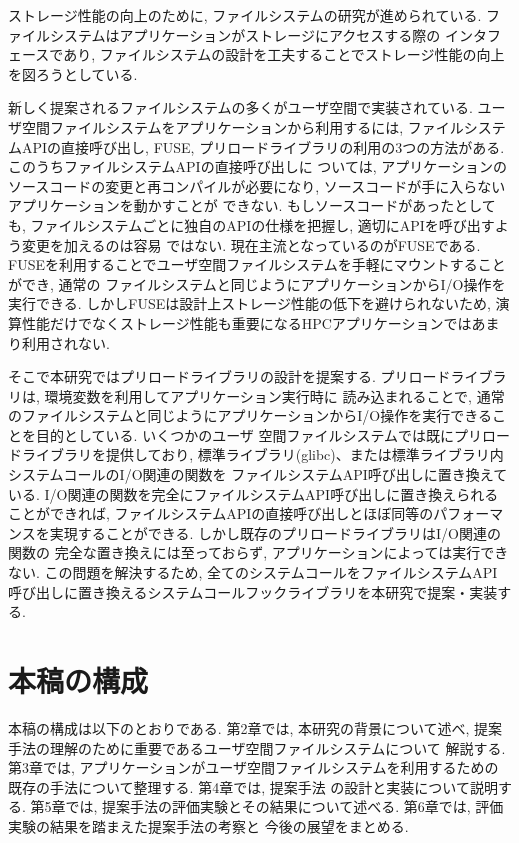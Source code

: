 \documentclass[a4paper,11pt]{jreport}
\begin{document}
ストレージ性能の向上のために, ファイルシステムの研究が進められている. ファイルシステムはアプリケーションがストレージにアクセスする際の
インタフェースであり, ファイルシステムの設計を工夫することでストレージ性能の向上を図ろうとしている.  

新しく提案されるファイルシステムの多くがユーザ空間で実装されている. ユーザ空間ファイルシステムをアプリケーションから利用するには, 
ファイルシステムAPIの直接呼び出し, FUSE, プリロードライブラリの利用の3つの方法がある. このうちファイルシステムAPIの直接呼び出しに
ついては, アプリケーションのソースコードの変更と再コンパイルが必要になり, ソースコードが手に入らないアプリケーションを動かすことが
できない. もしソースコードがあったとしても, ファイルシステムごとに独自のAPIの仕様を把握し, 適切にAPIを呼び出すよう変更を加えるのは容易
ではない. 現在主流となっているのがFUSEである. FUSEを利用することでユーザ空間ファイルシステムを手軽にマウントすることができ, 通常の
ファイルシステムと同じようにアプリケーションからI/O操作を実行できる. しかしFUSEは設計上ストレージ性能の低下を避けられないため, 
演算性能だけでなくストレージ性能も重要になるHPCアプリケーションではあまり利用されない. 

そこで本研究ではプリロードライブラリの設計を提案する. プリロードライブラリは, 環境変数を利用してアプリケーション実行時に
読み込まれることで, 通常のファイルシステムと同じようにアプリケーションからI/O操作を実行できることを目的としている. いくつかのユーザ
空間ファイルシステムでは既にプリロードライブラリを提供しており, 標準ライブラリ(glibc)、または標準ライブラリ内システムコールのI/O関連の関数を
ファイルシステムAPI呼び出しに置き換えている. I/O関連の関数を完全にファイルシステムAPI呼び出しに置き換えられることができれば, 
ファイルシステムAPIの直接呼び出しとほぼ同等のパフォーマンスを実現することができる. しかし既存のプリロードライブラリはI/O関連の関数の
完全な置き換えには至っておらず, アプリケーションによっては実行できない. この問題を解決するため, 全てのシステムコールをファイルシステムAPI
呼び出しに置き換えるシステムコールフックライブラリを本研究で提案・実装する.

\section{本稿の構成}
本稿の構成は以下のとおりである. 第2章では, 本研究の背景について述べ, 提案手法の理解のために重要であるユーザ空間ファイルシステムについて
解説する. 第3章では, アプリケーションがユーザ空間ファイルシステムを利用するための既存の手法について整理する. 第4章では, 提案手法
の設計と実装について説明する. 第5章では, 提案手法の評価実験とその結果について述べる. 第6章では, 評価実験の結果を踏まえた提案手法の考察と
今後の展望をまとめる.
\end{document}
